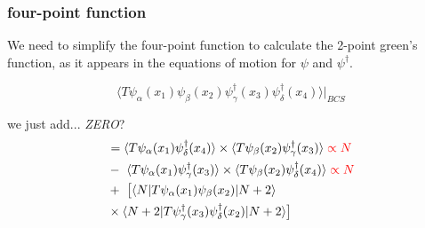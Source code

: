 \documentclass{beamer}
\begin{document}
\begin{frame}
\frametitle{four-point function}
We need to simplify the four-point function to calculate the 2-point green's function, as it appears in the equations of motion for $\psi$ and $\psi^{\dagger}$. 

\begin{equation*}
\langle T \psi_{\alpha}(x_1) \psi_{\beta}(x_2) \psi_{\gamma}^{\dagger}(x_3) \psi_{\delta}^{\dagger}(x_4) \rangle |_{BCS}
\end{equation*}

we just add... \textit{ZERO}?
\begin{eqnarray*}
& = \langle T \psi_{\alpha}(x_1)\psi_{\delta}^{\dagger}(x_4) \rangle\times\langle T \psi_{\beta}(x_2) \psi_{\gamma}^{\dagger}(x_3) \rangle\color{red}\propto N \\
& - \ \langle T \psi_{\alpha}(x_1)\psi_{\gamma}^{\dagger}(x_3) \rangle\times\langle T \psi_{\beta}(x_2) \psi_{\delta}^{\dagger}(x_4) \rangle\color{red}\propto N \\
& + \ \big[\langle N|T \psi_{\alpha}(x_1)\psi_{\beta}(x_2)|N+2\rangle \\
& \times \langle N+2|T \psi_{\gamma}^{\dagger}(x_3)\psi_{\delta}^{\dagger}(x_2)|N+2\rangle\big]
\end{eqnarray*}

\end{frame}

\end{document}
